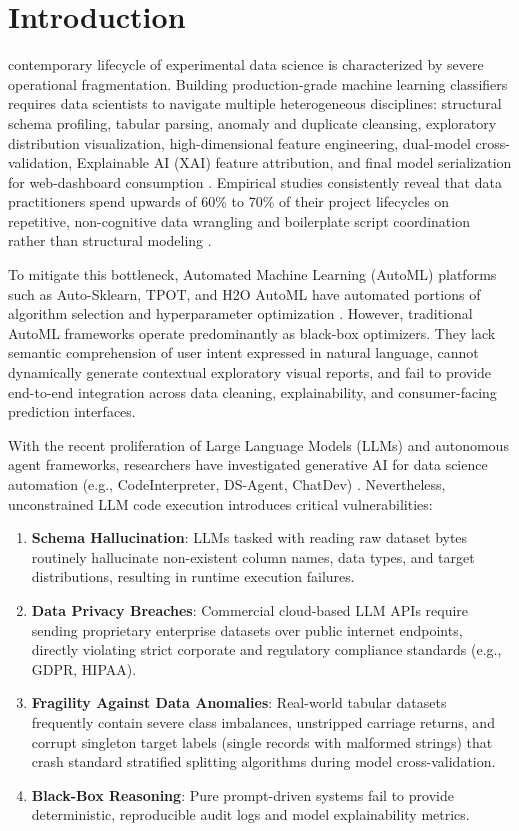 \documentclass[conference]{IEEEtran}
\begin{document}
\section{Introduction}
 contemporary lifecycle of experimental data science is characterized by severe operational fragmentation. Building production-grade machine learning classifiers requires data scientists to navigate multiple heterogeneous disciplines: structural schema profiling, tabular parsing, anomaly and duplicate cleansing, exploratory distribution visualization, high-dimensional feature engineering, dual-model cross-validation, Explainable AI (XAI) feature attribution, and final model serialization for web-dashboard consumption \cite{hutter2019automl, he2021automl}. Empirical studies consistently reveal that data practitioners spend upwards of 60\% to 70\% of their project lifecycles on repetitive, non-cognitive data wrangling and boilerplate script coordination rather than structural modeling \cite{munpy2020}.

To mitigate this bottleneck, Automated Machine Learning (AutoML) platforms such as Auto-Sklearn, TPOT, and H2O AutoML have automated portions of algorithm selection and hyperparameter optimization \cite{feurer2015autosklearn, olson2016tpot}. However, traditional AutoML frameworks operate predominantly as black-box optimizers. They lack semantic comprehension of user intent expressed in natural language, cannot dynamically generate contextual exploratory visual reports, and fail to provide end-to-end integration across data cleaning, explainability, and consumer-facing prediction interfaces.

With the recent proliferation of Large Language Models (LLMs) and autonomous agent frameworks, researchers have investigated generative AI for data science automation (e.g., CodeInterpreter, DS-Agent, ChatDev) \cite{hong2023metagpt, guo2024dsagent}. Nevertheless, unconstrained LLM code execution introduces critical vulnerabilities:
\begin{enumerate}
    \item \textbf{Schema Hallucination}: LLMs tasked with reading raw dataset bytes routinely hallucinate non-existent column names, data types, and target distributions, resulting in runtime execution failures.
    \item \textbf{Data Privacy Breaches}: Commercial cloud-based LLM APIs require sending proprietary enterprise datasets over public internet endpoints, directly violating strict corporate and regulatory compliance standards (e.g., GDPR, HIPAA).
    \item \textbf{Fragility Against Data Anomalies}: Real-world tabular datasets frequently contain severe class imbalances, unstripped carriage returns, and corrupt singleton target labels (single records with malformed strings) that crash standard stratified splitting algorithms during model cross-validation.
    \item \textbf{Black-Box Reasoning}: Pure prompt-driven systems fail to provide deterministic, reproducible audit logs and model explainability metrics.
\end{enumerate}
\end{document}
